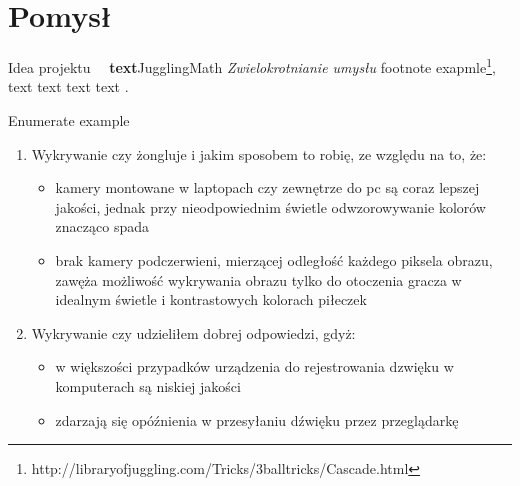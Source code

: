\section{Pomysł}

\hypertarget{Toc448677644}{}

\bigskip

    \newline
    \akapit
    Idea projektu \ \
    \textbf{text}{JugglingMath}
    \textit{Zwielokrotnianie umysłu}
    \cite{jugglinggoodforbranin}
    footnote exapmle\footnote{http://libraryofjuggling.com/Tricks/3balltricks/Cascade.html},  \newline
    text text text text
    . %
\bigskip


\bigskip

Enumerate example

\begin{enumerate}
\item Wykrywanie czy żongluje i jakim sposobem to robię,
ze względu na to, że:
    \begin{itemize}
        \item kamery montowane w laptopach czy zewnętrze do  
        \acrshort{pc}
        są coraz lepszej
        jakości, jednak przy nieodpowiednim świetle
        odwzorowywanie kolorów znacząco spada
        \item brak kamery podczerwieni, mierzącej odległość każdego
        piksela obrazu, zawęża możliwość wykrywania obrazu tylko
        do otoczenia gracza w idealnym
        świetle i kontrastowych kolorach piłeczek
    \end{itemize}
\item Wykrywanie czy udzieliłem dobrej odpowiedzi, gdyż:
    \begin{itemize}
        \item w większości przypadków urządzenia do rejestrowania
        dzwięku w komputerach są niskiej jakości
        \item zdarzają się  opóźnienia w przesyłaniu
        dźwięku przez przeglądarkę
    \end{itemize}
\end{enumerate}

\newpage

